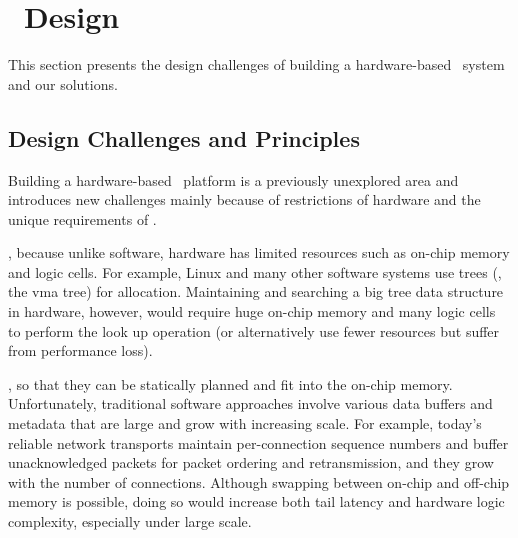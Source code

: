 \section{\sys\ Design}
\label{sec:design}



This section presents the design challenges of building a hardware-based \md\ system and our solutions.

\subsection{Design Challenges and Principles}
Building a hardware-based \md\ platform is a previously unexplored area and introduces new challenges mainly because of restrictions of hardware and the unique requirements of \md.


, because unlike software, hardware has limited resources such as on-chip memory and logic cells.
For example, Linux and many other software systems use trees (\eg, the vma tree) for allocation.
Maintaining and searching a big tree data structure in hardware, however, would require huge on-chip memory and many logic cells to perform the look up operation (or alternatively use fewer resources but suffer from performance loss).


, so that they can be statically planned and fit into the on-chip memory.
Unfortunately, traditional software approaches 
involve various data buffers and metadata that are large and grow with increasing scale.
For example, today's reliable network transports maintain per-connection sequence numbers and buffer unacknowledged packets for packet ordering and retransmission, and they grow with the number of connections.
Although swapping between on-chip and off-chip memory is possible, doing so would increase both tail latency and hardware logic complexity, especially under large scale.


